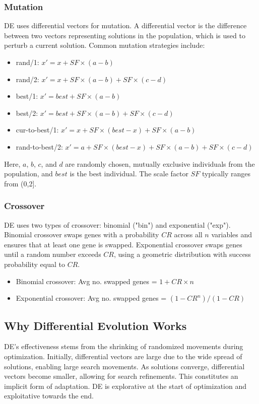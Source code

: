 \subsubsection*{Mutation}
DE uses differential vectors for mutation. A differential vector is the difference between two vectors representing solutions in the population, which is used to perturb a current solution. Common mutation strategies include:
\begin{itemize}
    \item rand/1: $x' = x + SF \times (a - b)$
    \item rand/2: $x' = x + SF \times (a - b) + SF \times (c - d)$
    \item best/1: $x' = best + SF \times (a - b)$
    \item best/2: $x' = best + SF \times (a - b) + SF \times (c - d)$
    \item cur-to-best/1: $x' = x + SF \times (best - x) + SF \times (a - b)$
    \item rand-to-best/2: $x' = a + SF \times (best - x) + SF \times (a - b) + SF \times (c - d)$
\end{itemize}
Here, $a$, $b$, $c$, and $d$ are randomly chosen, mutually exclusive individuals from the population, and $best$ is the best individual. The scale factor $SF$ typically ranges from (0,2].

\subsubsection*{Crossover}
DE uses two types of crossover: binomial ("bin") and exponential ("exp"). Binomial crossover swaps genes with a probability $CR$ across all $n$ variables and ensures that at least one gene is swapped.  Exponential crossover swaps genes until a random number exceeds $CR$, using a geometric distribution with success probability equal to $CR$.
\begin{itemize}
    \item Binomial crossover: Avg no. swapped genes = $1+CR \times n$
    \item Exponential crossover: Avg no. swapped genes = $(1-CR^n)/(1-CR)$
\end{itemize}

\subsection*{Why Differential Evolution Works}
DE's effectiveness stems from the shrinking of randomized movements during optimization. Initially, differential vectors are large due to the wide spread of solutions, enabling large search movements. As solutions converge, differential vectors become smaller, allowing for search refinements. This constitutes an implicit form of adaptation. DE is explorative at the start of optimization and exploitative towards the end.

